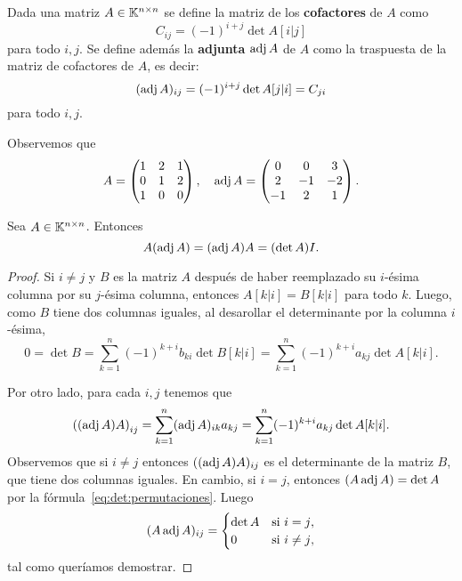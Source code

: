 \begin{block}
    Dada una matriz $A\in\mathbb{K}^{n\times n}$ se define la matriz de los \textbf{cofactores}
    de $A$ como 
    \[
        C_{ij}=(-1)^{i+j}\det A[i|j]
    \]
    para todo $i,j$. Se define además 
    la \textbf{adjunta} $\operatorname{adj} A$ de $A$ como 
    la traspuesta de la matriz de cofactores de $A$, es decir:
    \[
    (\operatorname{adj} A)_{ij}=(-1)^{i+j}\det A[j|i]=C_{ji}
    \]
    para todo $i,j$.
\end{block}

\begin{example}
	Observemos que 
	\[
		A=\begin{pmatrix}
			1 & 2 & 1\\
			0 & 1 & 2\\
			1 & 0 & 0
		\end{pmatrix}
		,\quad
		\operatorname{adj} A=\begin{pmatrix}
			0 & 0 & 3\\
			2 & -1 & -2\\
			-1 & 2 & 1
		\end{pmatrix}.
	\]
\end{example}

\begin{example}
		
\end{example}

\begin{thm}
    \label{thm:AadjA=(detA)I}
    Sea $A\in\mathbb{K}^{n\times n}$. Entonces 
    \[
        A(\operatorname{adj} A)=(\operatorname{adj} A)A=(\det A)I.
    \]

	\begin{proof}
		Si $i\ne j$ y $B$ es la matriz $A$ después de haber reemplazado su
		$i$-ésima columna por su $j$-ésima columna, entonces $A[k|i]=B[k|i]$
		para todo $k$. Luego, como $B$ tiene dos columnas iguales, al
		desarollar el determinante por la columna $i$-ésima, 
        \[
        0=\det B=\sum_{k=1}^n(-1)^{k+i}b_{ki}\det B[k|i]=\sum_{k=1}^n(-1)^{k+i}a_{kj}\det A[k|i].
        \]

        Por otro lado, para cada $i,j$ tenemos que 
        \begin{align*}
            \left((\operatorname{adj} A)A\right)_{ij}=\sum_{k=1}^n (\operatorname{adj} A)_{ik}a_{kj}=\sum_{k=1}^n (-1)^{k+i}a_{kj}\det A[k|i].
        \end{align*}
        Observemos que si $i\ne j$ entonces $((\operatorname{adj} A)A)_{ij}$ es el determinante de la matriz $B$, que 
        tiene dos columnas iguales. En cambio, si $i=j$, entonces $(A\operatorname{adj} A)=\det A$ por
		la fórmula~\ref{eq:det:permutaciones}. 
        Luego
        \[
            (A\operatorname{adj} A)_{ij}=\begin{cases}
                \det A & \text{si $i=j$},\\
                0 & \text{si $i\ne j$},
            \end{cases}
        \]
        tal como queríamos demostrar.
    \end{proof}
\end{thm}

